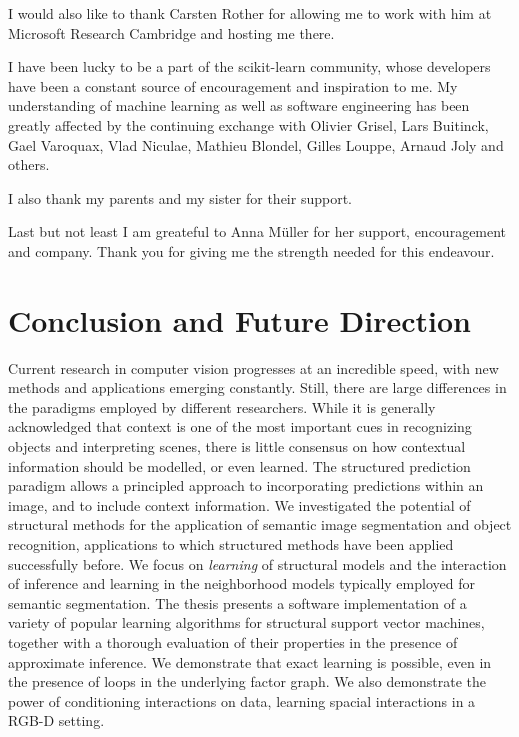 \documentclass[12pt,toc=bibnumbered, a4paper,twoside,DIV=11,BCOR=.5cm]{scrbook}
\begin{document}
I would also like to thank Carsten Rother for allowing me to work with him
at Microsoft Research Cambridge and hosting me there.

I have been lucky to be a part of the scikit-learn community, whose developers
have been a constant source of encouragement and inspiration to me. My
understanding of machine learning as well as software engineering has been
greatly affected by the continuing exchange with Olivier Grisel, Lars Buitinck,
Gael Varoquax, Vlad Niculae, Mathieu Blondel, Gilles Louppe, Arnaud Joly and
others.

I also thank my parents and my sister for their support.

Last but not least I am greateful to Anna M\"uller for her support,
encouragement and company. Thank you for giving me the strength needed for this
endeavour.
\cleardoublepage
{}


%

%

%









\chapter{Conclusion and Future Direction}
Current research in computer vision progresses at an incredible speed, with new
methods and applications emerging constantly.  Still, there are large
differences in the paradigms employed by different researchers.  While it is
generally acknowledged that context is one of the most important cues in
recognizing objects and interpreting scenes, there is little consensus on how
contextual information should be modelled, or even learned.
The structured prediction paradigm allows a principled approach to
incorporating predictions within an image, and to include context information.
We investigated the potential of structural methods for the application of
semantic image segmentation and object recognition, applications to which
structured methods have been applied successfully before.  We focus on
\emph{learning} of structural models and the interaction of inference and
learning in the neighborhood models typically employed for semantic
segmentation.
The thesis presents a software implementation of a variety of popular learning
algorithms for structural support vector machines, together with a thorough
evaluation of their properties in the presence of approximate inference.
We demonstrate that exact learning is possible, even in the presence of loops in the
underlying factor graph. We also demonstrate the power of conditioning interactions
on data, learning spacial interactions in a RGB-D setting.
\end{document}
